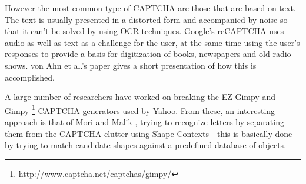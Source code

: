 \documentclass[a4paper,12pt]{article}
\begin{document}
However the most common type of CAPTCHA are those that are based
on text. The text is usually presented in a distorted form
and accompanied by noise so that it can't be solved by using OCR
techniques. Google's reCAPTCHA uses audio as well as text as
a challenge for the user, at the same time using the user's
responses to provide a basis for digitization of books, newspapers
and old radio shows. von Ahn et al.'s paper \cite{vonAhn12092008}
gives a short presentation of how this is accomplished.

A large number of researchers have worked on breaking the EZ-Gimpy
and Gimpy \footnote{\url{http://www.captcha.net/captchas/gimpy/}}
CAPTCHA generators used by Yahoo. From these, an interesting
approach is that of Mori and Malik
\cite{Mori:2003:ROA:1965841.1965858}, trying to recognize letters
by separating them from the CAPTCHA clutter using Shape Contexts
 - this is basically done by trying to match candidate shapes
 against a predefined database of objects.


\vskip 0.2in


\end{document}
